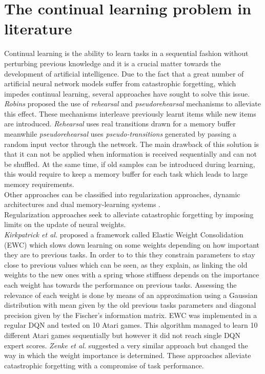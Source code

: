 \documentclass{article}
\begin{document}
\section{The continual learning problem in literature}
Continual learning is the ability to learn tasks in a sequential fashion without perturbing previous knowledge and it is a crucial matter towards the development of artificial intelligence. Due to the fact that a great number of artificial neural network models suffer from catastrophic forgetting, which impedes continual learning, several approaches have sought to solve this issue.\\
\newline
\textit{Robins} \citep{RobinsConsolidationBrain} proposed the use of \textit{rehearsal} and \textit{pseudorehearsal} mechanisms to alleviate this effect. These mechanisms interleave previously learnt items while new items are introduced. \textit{Rehearsal} uses real transitions drawn for a memory buffer meanwhile \textit{pseudorehearsal} uses \textit{pseudo-transitions} generated by passing a random input vector through the network. The main drawback of this solution is that it can not be applied when information is received sequentially and can not be shuffled. At the same time, if old samples can be introduced during learning, this would require to keep a memory buffer for each task which leads to large memory requirements.\\
Other approaches can be classified into regularization approaches, dynamic architectures and dual memory-learning systems \citep{Parisi2018ContinualReview}.\\
Regularization approaches seek to alleviate catastrophic forgetting by imposing limits on the update of neural weights.\\ \textit{Kirkpatrick et al.} \citep{Kirkpatrick2017OvercomingNetworks.} proposed a framework called Elastic Weight Consolidation (EWC) which slows down learning on some weights depending on how important they are to previous tasks. In order to to this they constrain parameters to stay close to previous values which can be seen, as they explain, as linking the old weights to the new ones with a spring whose stiffness depends on the importance each weight has towards the performance on previous tasks. Assessing the relevance of each weight is done by means of an approximation using a Gaussian distribution with mean given by the old previous tasks parameters and diagonal precision given by the Fischer's information matrix. EWC was implemented in a regular DQN and tested on 10 Atari games. This algorithm managed to learn  10 different Atari games sequentially but however it did not reach single DQN expert scores. \textit{Zenke et al.} \citep{Zenke2017ContinualIntelligence} suggested a very similar approach but changed the way in which the weight importance is determined. These approaches alleviate catastrophic forgetting with a compromise of task performance.\\
\end{document}
